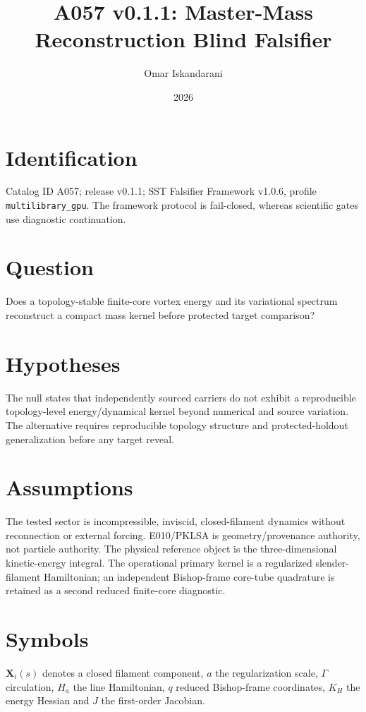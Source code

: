 \documentclass[11pt]{article}
\title{A057 v0.1.1: Master-Mass Reconstruction Blind Falsifier}
\author{Omar Iskandarani}
\date{2026}
\begin{document}
\maketitle

\section{Identification}
Catalog ID A057; release v0.1.1; SST Falsifier Framework v1.0.6, profile \texttt{multilibrary\_gpu}. The framework protocol is fail-closed, whereas scientific gates use diagnostic continuation.

\section{Question}
Does a topology-stable finite-core vortex energy and its variational spectrum reconstruct a compact mass kernel before protected target comparison?

\section{Hypotheses}
The null states that independently sourced carriers do not exhibit a reproducible topology-level energy/dynamical kernel beyond numerical and source variation. The alternative requires reproducible topology structure and protected-holdout generalization before any target reveal.

\section{Assumptions}
The tested sector is incompressible, inviscid, closed-filament dynamics without reconnection or external forcing. E010/PKLSA is geometry/provenance authority, not particle authority. The physical reference object is the three-dimensional kinetic-energy integral. The operational primary kernel is a regularized slender-filament Hamiltonian; an independent Bishop-frame core-tube quadrature is retained as a second reduced finite-core diagnostic.

\section{Symbols}
\(\mathbf X_i(s)\) denotes a closed filament component, \(a\) the regularization scale, \(\Gamma\) circulation, \(H_a\) the line Hamiltonian, \(q\) reduced Bishop-frame coordinates, \(K_H\) the energy Hessian and \(J\) the first-order Jacobian.
\end{document}
